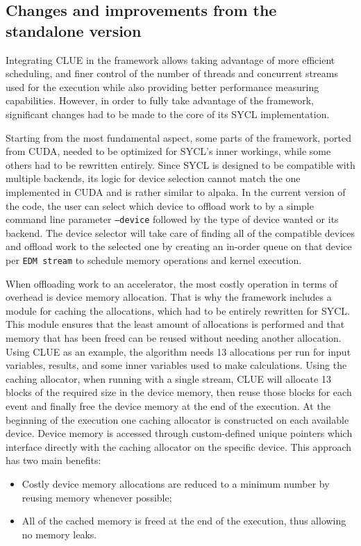 \subsection{Changes and improvements from the standalone version}
Integrating CLUE in the framework allows taking advantage of more efficient scheduling, and finer control of the number of threads and concurrent streams used for the execution while also providing better performance measuring capabilities. However, in order to fully take advantage of the framework, significant changes had to be made to the core of its SYCL implementation. 

Starting from the most fundamental aspect, some parts of the framework, ported from CUDA, needed to be optimized for SYCL's inner workings, while some others had to be rewritten entirely. Since SYCL is designed to be compatible with multiple backends, its logic for device selection cannot match the one implemented in CUDA and is rather similar to alpaka. In the current version of the code, the user can select which device to offload work to by a simple command line parameter \texttt{--device} followed by the type of device wanted or its backend. The device selector will take care of finding all of the compatible devices and offload work to the selected one by creating an in-order queue on that device per \texttt{EDM stream} to schedule memory operations and kernel execution.

When offloading work to an accelerator, the most costly operation in terms of overhead is device memory allocation. That is why the framework includes a module for caching the allocations, which had to be entirely rewritten for SYCL. This module ensures that the least amount of allocations is performed and that memory that has been freed can be reused without needing another allocation. Using CLUE as an example, the algorithm needs 13 allocations per run for input variables, results, and some inner variables used to make calculations. Using the caching allocator, when running with a single stream, CLUE will allocate 13 blocks of the required size in the device memory, then reuse those blocks for each event and finally free the device memory at the end of the execution. At the beginning of the execution one caching allocator is constructed on each available device. Device memory is accessed through custom-defined unique pointers which interface directly with the caching allocator on the specific device. This approach has two main benefits:
\begin{itemize}
    \item Costly device memory allocations are reduced to a minimum number by reusing memory whenever possible;
    \item All of the cached memory is freed at the end of the execution, thus allowing no memory leaks.
\end{itemize}

